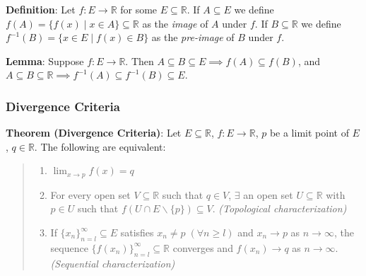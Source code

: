 \documentclass[11pt]{article}
\begin{document}
\textbf{Definition}: Let $f : E \to \mathbb{R}$ for some $E \subseteq \mathbb{R}$. If $A \subseteq E$ we define $f(A) = \{f(x) \mid x \in A\} \subseteq \mathbb{R}$ as the \emph{image} of $A$ under $f$. If $B \subseteq \mathbb{R}$ we define $f^{-1}(B) = \{x \in E \mid f(x) \in B\}$ as the \emph{pre-image} of $B$ under $f$.

\textbf{Lemma}: Suppose $f : E \to \mathbb{R}$. Then $A \subseteq B \subseteq E \implies f(A) \subseteq f(B)$, and\\
$A \subseteq B \subseteq \mathbb{R} \implies f^{-1}(A) \subseteq f^{-1}(B) \subseteq E$.

\subsubsection{Divergence Criteria}

\textbf{Theorem (Divergence Criteria)}: Let $E \subseteq \mathbb{R}$, $f : E \to \mathbb{R}$, $p$ be a limit point of $E$, $q \in \mathbb{R}$. The following are equivalent:
\begin{quote}\vspace{-0.3cm}
	\begin{enumerate}
	\item $\lim_{x \to p} f(x) = q$
	\item For every open set $V \subseteq \mathbb{R}$ such that $q \in V$, $\exists$ an open set $U \subseteq \mathbb{R}$ with $p \in U$ such that $f(U \cap E \backslash \{p\}) \subseteq V$. \emph{(Topological characterization)}
	\item If $\{x_n\}_{n=l}^\infty \subseteq E$ satisfies $x_n \neq p \;(\forall n \geq l)$ and $x_n \to p$ as $n \to \infty$, the sequence $\{f(x_n)\}_{n=l}^\infty \subseteq \mathbb{R}$ converges and $f(x_n) \to q$ as $n \to \infty$. \emph{(Sequential characterization)}
	\end{enumerate}
\end{quote}
\end{document}
